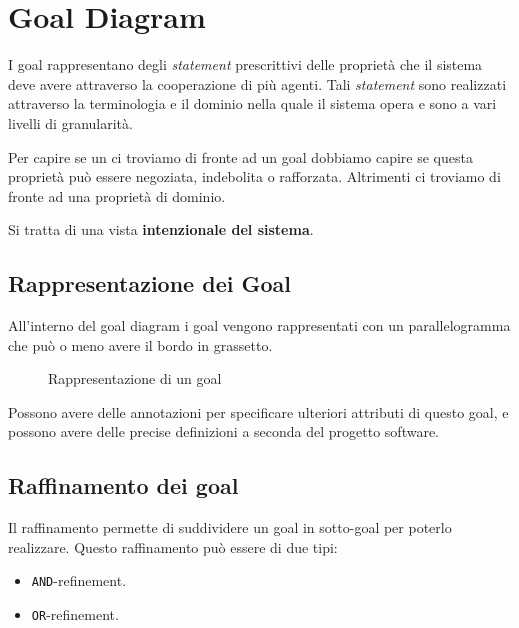 \chapter{Goal Diagram}
I goal rappresentano degli \textit{statement} prescrittivi delle 
proprietà che il sistema deve avere attraverso la cooperazione 
di più agenti. Tali \textit{statement} sono realizzati attraverso la 
terminologia e il dominio nella quale il sistema opera e 
sono a vari livelli di granularità.

Per capire se un ci troviamo di fronte ad un goal dobbiamo capire 
se questa proprietà può essere negoziata, indebolita o rafforzata.
Altrimenti ci troviamo di fronte ad una proprietà 
di dominio.

Si tratta di una vista \textbf{intenzionale del sistema}.

\section{Rappresentazione dei Goal}
All'interno del goal diagram i goal vengono rappresentati con 
un parallelogramma che può o meno avere il bordo in grassetto.
\begin{figure}[H]
    \centering
    \caption{Rappresentazione di un goal}
\end{figure}
Possono avere delle annotazioni per specificare ulteriori attributi 
di questo goal, e possono avere delle precise definizioni a 
seconda del progetto software.

\section{Raffinamento dei goal}
Il raffinamento permette di suddividere un goal in sotto-goal
per poterlo realizzare. Questo raffinamento può essere di due tipi:
\begin{itemize}
    \item \texttt{AND}-refinement.
    \item \texttt{OR}-refinement.
\end{itemize}
